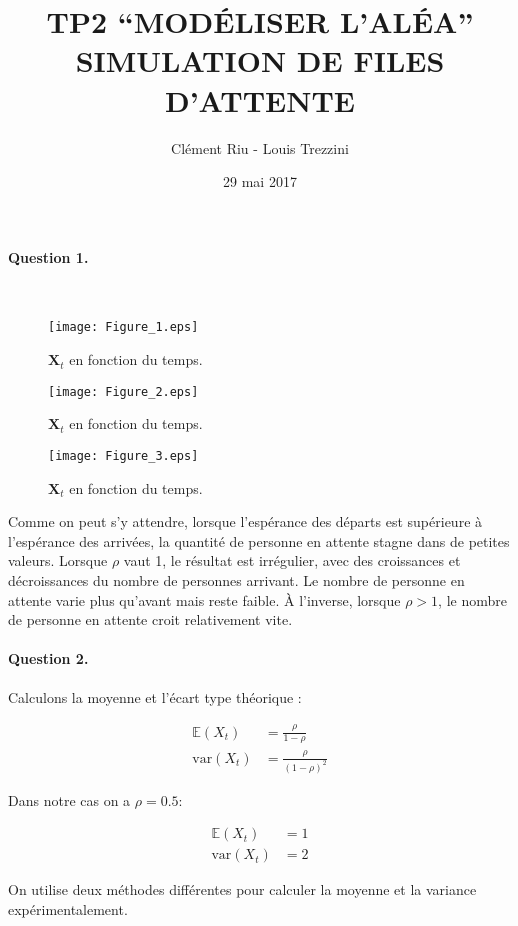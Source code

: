 \documentclass[12pt,a4paper]{article}
\title{\textbf{TP2 “MODÉLISER L’ALÉA” \\ SIMULATION DE FILES D'ATTENTE}}
\author{Clément Riu - Louis Trezzini}
\date{29 mai 2017}
\begin{document}
\maketitle

\paragraph*{Question 1.} ~\\

\begin{figure}[H]
	\centering
	\texttt{[image: Figure\_1.eps]}
	\caption{$\mathbf{X}_t$ en fonction du temps.}
\end{figure}
\begin{figure}[H]
	\centering
	\texttt{[image: Figure\_2.eps]}
	\caption{$\mathbf{X}_t$ en fonction du temps.}
\end{figure}
\begin{figure}[H]
	\centering
	\texttt{[image: Figure\_3.eps]}
	\caption{$\mathbf{X}_t$ en fonction du temps.}
\end{figure}

Comme on peut s'y attendre, lorsque l’espérance des départs est supérieure à l'espérance des arrivées, la quantité de personne en attente stagne dans de petites valeurs. Lorsque $\rho$ vaut 1, le résultat est irrégulier, avec des croissances et décroissances du nombre de personnes arrivant. Le nombre de personne en attente varie plus qu'avant mais reste faible. À l'inverse, lorsque $\rho > 1$, le nombre de personne en attente croit relativement vite.

\paragraph*{Question 2.}

Calculons la moyenne et l'écart type théorique : 

\begin{align*}
\mathbb{E}(X_t) &= \frac{\rho}{1 - \rho} \\
\text{var}(X_t) &= \frac{\rho}{(1 - \rho)^2}
\end{align*}

Dans notre cas on a $\rho = 0.5$: 

\begin{align*}
\mathbb{E}(X_t) &= 1 \\
\text{var}(X_t) &= 2
\end{align*}

On utilise deux méthodes différentes pour calculer la moyenne et la variance expérimentalement.
\end{document}
